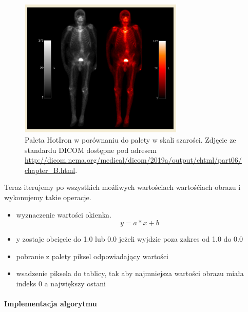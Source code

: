 \begin{figure}[!htbp]
    \centering
    \includegraphics[width=0.7\textwidth]{img/monochrome-001.png}
    \caption{Paleta HotIron w porównaniu do palety w skali szarości. Zdjęcie ze standardu DICOM dostępne pod adresem \url{http://dicom.nema.org/medical/dicom/2019a/output/chtml/part06/chapter_B.html}.}
    \label{fig:monochrome1}
\end{figure}

Teraz iterujemy po wszystkich możliwych wartościach wartośćiach obrazu i wykonujemy takie operacje.
\begin{itemize}
    \item wyznaczenie wartości okienka.
          \[y = a * x + b\]
    \item y zostaje obcięcie do 1.0 lub 0.0 jeżeli wyjdzie poza zakres od 1.0 do 0.0
    \item pobranie z palety piksel odpowiadający wartości
    \item wsadzenie piksela do tablicy, tak aby najmniejsza wartości obrazu miała indeks 0 a największy ostani
\end{itemize}


\paragraph{Implementacja algorytmu}

